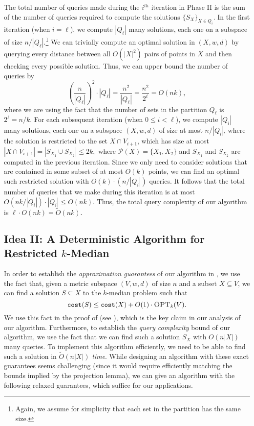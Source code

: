 \documentclass[11pt]{article}
\newcommand{\1}{\mathmybb{1}}
\newcommand{\OPT}{\textsc{OPT}}
\newcommand{\cost}{\textnormal{\texttt{cost}}}
\newcommand{\calP}[0]{\mathcal{P}}
\begin{document}
The total number of queries made during the $i^{th}$ iteration in Phase II is the sum of the number of queries required to compute the solutions $\{S_X\}_{X \in Q_i}$.
In the first iteration (when $i = \ell$), we compute $|Q_\ell|$ many solutions, each one on a subspace of size $n/|Q_\ell|$.\footnote{Again, we assume for simplicity that each set in the partition has the same size.} We can trivially compute an optimal solution in $(X,w,d)$ by querying every distance between all $O(|X|^2)$ pairs of points in $X$ and then checking every possible solution. Thus, we can upper bound the number of queries by
\begin{equation*}
\left(\frac{n}{|Q_\ell|}\right)^2 \cdot |Q_\ell| 
= \frac{n^2}{|Q_\ell|} 
= \frac{n^2}{2^\ell} = O(nk),
\end{equation*}
where we are using the fact that the number of sets in the partition $Q_\ell$ is $2^\ell = n/k$.
For each subsequent iteration (when $0 \leq i < \ell$), we compute $|Q_i|$ many solutions, each one on a subspace $(X,w,d)$ of size at most $n/|Q_i|$, where the solution is restricted to the set  $X \cap V_{i+1}$, which has size at most
$ |X \cap V_{i+1}| = |S_{X_1} \cup S_{X_2}| \leq 2k, $
where $\calP(X) = \{X_1, X_2\}$ and $S_{X_1}$ and $S_{X_2}$ are computed in the previous iteration.
Since we only need to consider solutions that are contained in some subset of at most $O(k)$ points, we can find an optimal such restricted solution with $O(k) \cdot (n/|Q_i|)$ queries.
It follows that the total number of queries that we make during this iteration is at most
$O(nk/|Q_i|) \cdot |Q_i| \leq O(nk)$.
Thus, the total query complexity of our algorithm is $\ell \cdot O(nk) = \tilde O(nk)$.






\subsection{Idea II: A Deterministic Algorithm for Restricted $k$-Median}

In order to establish the \emph{approximation guarantees} of our algorithm in , we use the fact that, given a metric subspace $(V,w,d)$ of size $n$ and a subset $X \subseteq V$, we can find a solution $S \subseteq X$ to the $k$-median problem such that
\begin{equation}\label{eq:watwe need}
    \cost(S) \leq \cost(X) + O(1) \cdot \OPT_k(V).
\end{equation}
We use this fact in the proof of  (see ), which is the key claim in our analysis of our algorithm.
Furthermore, to establish the \emph{query complexity} bound of our algorithm, we use the fact that we can find such a solution $S_X$ with $O(n |X|)$ many queries. To implement this algorithm efficiently, we need to be able to find such a solution in $\tilde O(n |X|)$ \emph{time}. While designing an algorithm with these exact guarantees seems challenging (since it would require efficiently matching the bounds implied by the projection lemma), we can give an algorithm with the following relaxed guarantees, which suffice for our applications.
\end{document}

